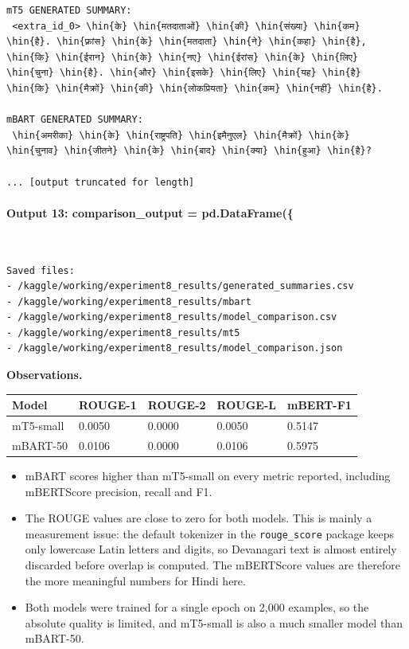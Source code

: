 \documentclass[12pt,a4paper,oneside]{report}
\newcommand{\hin}[1]{{\hinfont #1}}
\providecommand{\tightlist}{\setlength{\itemsep}{0pt}\setlength{\parskip}{0pt}}
\begin{document}
\begin{Verbatim}[commandchars=\\\{\},breaklines=true,breakanywhere=true,fontsize=\scriptsize,frame=leftline,framesep=2mm,rulecolor=\color{gray}]
mT5 GENERATED SUMMARY:
 <extra_id_0> \hin{के} \hin{मतदाताओं} \hin{की} \hin{संख्या} \hin{कम} \hin{है}. \hin{फ़्रांस} \hin{के} \hin{मतदाता} \hin{ने} \hin{कहा} \hin{है}, \hin{कि} \hin{ईरान} \hin{के} \hin{नए} \hin{ईरांस} \hin{के} \hin{लिए} \hin{चुना} \hin{है}. \hin{और} \hin{इसके} \hin{लिए} \hin{यह} \hin{है} \hin{कि} \hin{मैक्रों} \hin{की} \hin{लोकप्रियता} \hin{कम} \hin{नहीं} \hin{है}.

mBART GENERATED SUMMARY:
 \hin{अमरीका} \hin{के} \hin{राष्ट्रपति} \hin{इमैनुएल} \hin{मैक्रों} \hin{के} \hin{चुनाव} \hin{जीतने} \hin{के} \hin{बाद} \hin{क्या} \hin{हुआ} \hin{है}?

... [output truncated for length]
\end{Verbatim}
\paragraph{Output 13: comparison\_output = pd.DataFrame(\{}\mbox{}\\[-1ex]
\begin{Verbatim}[commandchars=\\\{\},breaklines=true,breakanywhere=true,fontsize=\scriptsize,frame=leftline,framesep=2mm,rulecolor=\color{gray}]
Saved files:
- /kaggle/working/experiment8_results/generated_summaries.csv
- /kaggle/working/experiment8_results/mbart
- /kaggle/working/experiment8_results/model_comparison.csv
- /kaggle/working/experiment8_results/mt5
- /kaggle/working/experiment8_results/model_comparison.json
\end{Verbatim}
\textbf{Observations.}

\begin{longtable}[]{@{}lllll@{}}
\toprule\noalign{}
Model & ROUGE-1 & ROUGE-2 & ROUGE-L & mBERT-F1 \\
\midrule\noalign{}
\endhead
\bottomrule\noalign{}
\endlastfoot
mT5-small & 0.0050 & 0.0000 & 0.0050 & 0.5147 \\
mBART-50 & 0.0106 & 0.0000 & 0.0106 & 0.5975 \\
\end{longtable}

\begin{itemize}
\tightlist
\item
  mBART scores higher than mT5-small on every metric reported, including mBERTScore precision, recall and F1.
\item
  The ROUGE values are close to zero for both models. This is mainly a measurement issue: the default tokenizer in the \texttt{rouge\_score} package keeps only lowercase Latin letters and digits, so Devanagari text is almost entirely discarded before overlap is computed. The mBERTScore values are therefore the more meaningful numbers for Hindi here.
\item
  Both models were trained for a single epoch on 2,000 examples, so the absolute quality is limited, and mT5-small is also a much smaller model than mBART-50.
\end{itemize}
\end{document}
